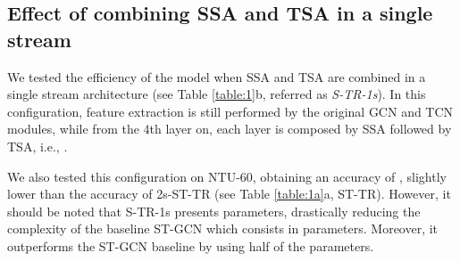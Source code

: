\documentclass[times,twocolumn,final,authoryear]{elsarticle}
\begin{document}
\subsection{Effect of combining SSA and TSA in a single stream}
We tested the efficiency of the model when SSA and TSA are combined in a single stream architecture (see Table \ref{table:1}b, referred as \textit{S-TR-1s}). In this configuration, feature extraction is still performed by the original GCN and TCN modules, while from the 4th layer on, each layer is composed by SSA followed by TSA, i.e., .

We also tested this configuration on NTU-60, obtaining an accuracy of , slightly lower than the  accuracy of 2s-ST-TR (see Table \ref{table:1a}a, ST-TR). However, it should be noted that S-TR-1s presents  parameters, drastically reducing the complexity of the baseline ST-GCN which consists in  parameters. Moreover, it outperforms the ST-GCN baseline by  using half of the parameters.
\end{document}
